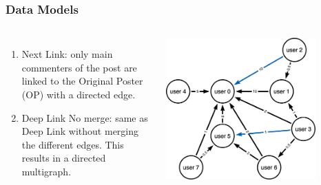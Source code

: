 \documentclass[aspectratio=169]{beamer}
\begin{document}
\begin{frame}[t]
    \frametitle{Data Models}
    \vspace{1.0cm}
    \begin{columns}
        \begin{enumerate}
            \suite
            \item Next Link: only main commenters of the post are linked to the Original Poster (OP) with a directed edge.
            \item Deep Link No merge: same as Deep Link without merging the different edges. This results in a directed multigraph.
        \end{enumerate}
        \includegraphics[width=0.8\textwidth]{figures/graph_model.png}
    \end{columns}
\end{frame}
\end{document}
